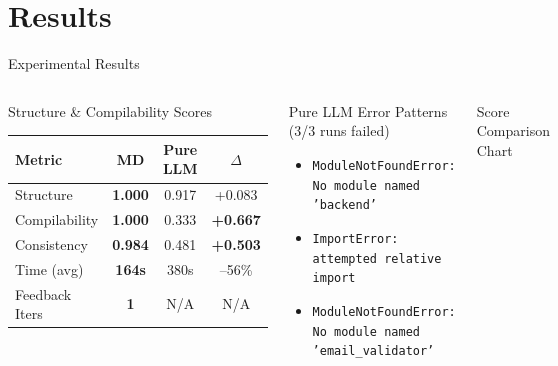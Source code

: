 \documentclass[10pt,aspectratio=169]{beamer}
\begin{document}
\section{Results}
\begin{frame}{Experimental Results}
\vspace{-8pt}

\begin{columns}[T]
\begin{block}{Structure \& Compilability Scores}
\begin{center}
\begin{tabular}{lccc}
\toprule
\textbf{Metric} & \textbf{MD} & \textbf{Pure LLM} & $\Delta$ \\
\midrule
Structure      & \textbf{1.000} & 0.917 & +0.083 \\
Compilability  & \textbf{1.000} & 0.333 & \textbf{+0.667} \\
Consistency    & \textbf{0.984} & 0.481 & \textbf{+0.503} \\
\midrule
Time (avg)     & \textbf{164s}  & 380s  & --56\% \\
Feedback Iters & \textbf{1}     & N/A   & N/A \\
\bottomrule
\end{tabular}
\end{center}
\end{block}

\begin{block}{Pure LLM Error Patterns (3/3 runs failed)}
\begin{itemize}
    \item \texttt{ModuleNotFoundError: No module named 'backend'}
    \item \texttt{ImportError: attempted relative import}
    \item \texttt{ModuleNotFoundError: No module named 'email\_validator'}
\end{itemize}
\end{block}

\begin{block}{Score Comparison Chart}
\begin{center}
\end{center}
\end{block}
\end{columns}
\end{frame}
\end{document}
